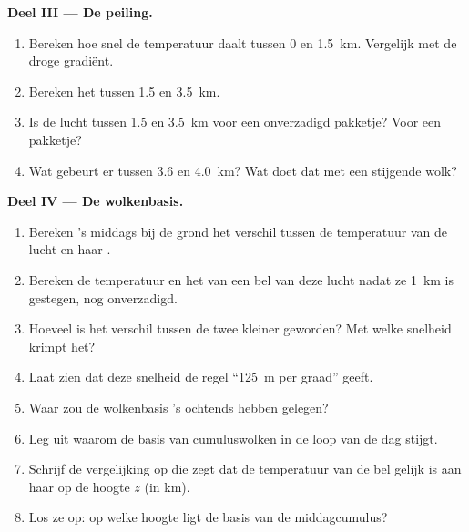 \begin{problem}
\medskip
\noindent\textbf{Deel III --- De peiling.}
\begin{enumerate}[resume]
  \item Bereken hoe snel de temperatuur daalt tussen \num{0} en \qty{1.5}{km}.
        Vergelijk met de droge gradiënt.
  \item Bereken het tussen \num{1.5} en \qty{3.5}{km}.
  \item Is de lucht tussen \num{1.5} en \qty{3.5}{km}  voor een
        onverzadigd pakketje? Voor een  pakketje?
  \item Wat gebeurt er tussen \num{3.6} en \qty{4.0}{km}? Wat doet dat met een
        stijgende wolk?
\end{enumerate}

\medskip
\noindent\textbf{Deel IV --- De wolkenbasis.}
\begin{enumerate}[resume]
  \item Bereken 's middags bij de grond het verschil tussen de temperatuur van de
        lucht en haar .
  \item Bereken de temperatuur en het  van een bel van deze lucht nadat
        ze \qty{1}{km} is gestegen, nog onverzadigd.
  \item Hoeveel is het verschil tussen de twee kleiner geworden? Met welke
        snelheid krimpt het?
  \item Laat zien dat deze snelheid de regel ``\qty{125}{m} per graad'' geeft.
  \item Waar zou de wolkenbasis 's ochtends hebben gelegen?
  \item Leg uit waarom de basis van cumuluswolken in de loop van de dag stijgt.
  \item Schrijf de vergelijking op die zegt dat de temperatuur van de bel gelijk
        is aan haar  op de hoogte $z$ (in km).
  \item Los ze op: op welke hoogte ligt de basis van de middagcumulus?
\end{enumerate}
\end{problem}
